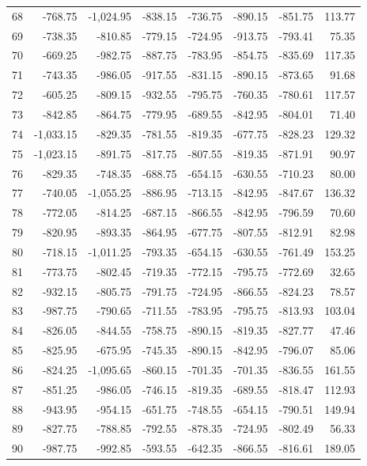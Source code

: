 \begin{longtable}{rrrrrrrr}
68 & -768.75 & -1,024.95 & -838.15 & -736.75 & -890.15 & -851.75 & 113.77  \\
69 & -738.35 & -810.85 & -779.15 & -724.95 & -913.75 & -793.41 & 75.35  \\
70 & -669.25 & -982.75 & -887.75 & -783.95 & -854.75 & -835.69 & 117.35  \\
71 & -743.35 & -986.05 & -917.55 & -831.15 & -890.15 & -873.65 & 91.68  \\
72 & -605.25 & -809.15 & -932.55 & -795.75 & -760.35 & -780.61 & 117.57  \\
73 & -842.85 & -864.75 & -779.95 & -689.55 & -842.95 & -804.01 & 71.40  \\
74 & -1,033.15 & -829.35 & -781.55 & -819.35 & -677.75 & -828.23 & 129.32  \\
75 & -1,023.15 & -891.75 & -817.75 & -807.55 & -819.35 & -871.91 & 90.97  \\
76 & -829.35 & -748.35 & -688.75 & -654.15 & -630.55 & -710.23 & 80.00  \\
77 & -740.05 & -1,055.25 & -886.95 & -713.15 & -842.95 & -847.67 & 136.32  \\
78 & -772.05 & -814.25 & -687.15 & -866.55 & -842.95 & -796.59 & 70.60  \\
79 & -820.95 & -893.35 & -864.95 & -677.75 & -807.55 & -812.91 & 82.98  \\
80 & -718.15 & -1,011.25 & -793.35 & -654.15 & -630.55 & -761.49 & 153.25  \\
81 & -773.75 & -802.45 & -719.35 & -772.15 & -795.75 & -772.69 & 32.65  \\
82 & -932.15 & -805.75 & -791.75 & -724.95 & -866.55 & -824.23 & 78.57  \\
83 & -987.75 & -790.65 & -711.55 & -783.95 & -795.75 & -813.93 & 103.04  \\
84 & -826.05 & -844.55 & -758.75 & -890.15 & -819.35 & -827.77 & 47.46  \\
85 & -825.95 & -675.95 & -745.35 & -890.15 & -842.95 & -796.07 & 85.06  \\
86 & -824.25 & -1,095.65 & -860.15 & -701.35 & -701.35 & -836.55 & 161.55  \\
87 & -851.25 & -986.05 & -746.15 & -819.35 & -689.55 & -818.47 & 112.93  \\
88 & -943.95 & -954.15 & -651.75 & -748.55 & -654.15 & -790.51 & 149.94  \\
89 & -827.75 & -788.85 & -792.55 & -878.35 & -724.95 & -802.49 & 56.33  \\
90 & -987.75 & -992.85 & -593.55 & -642.35 & -866.55 & -816.61 & 189.05  \\

\end{longtable}
